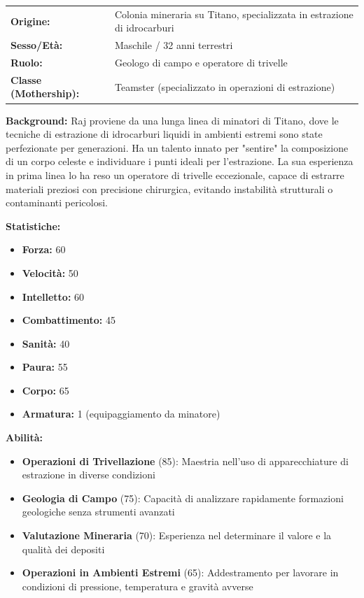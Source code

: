 \documentclass[11pt,a4paper]{article}
\begin{document}
\begin{tcolorbox}[colback=mininglightorange!20, colframe=miningorange]
\begin{tabularx}{\textwidth}{lX}
\textbf{Origine:} & Colonia mineraria su Titano, specializzata in estrazione di idrocarburi \\
\textbf{Sesso/Età:} & Maschile / 32 anni terrestri \\
\textbf{Ruolo:} & Geologo di campo e operatore di trivelle \\
\textbf{Classe (Mothership):} & Teamster (specializzato in operazioni di estrazione) \\
\end{tabularx}

\textbf{Background:} Raj proviene da una lunga linea di minatori di Titano, dove le tecniche di estrazione di idrocarburi liquidi in ambienti estremi sono state perfezionate per generazioni. Ha un talento innato per "sentire" la composizione di un corpo celeste e individuare i punti ideali per l'estrazione. La sua esperienza in prima linea lo ha reso un operatore di trivelle eccezionale, capace di estrarre materiali preziosi con precisione chirurgica, evitando instabilità strutturali o contaminanti pericolosi.

\textbf{Statistiche:}
\begin{itemize}[leftmargin=*]
\item \textbf{Forza:} 60
\item \textbf{Velocità:} 50
\item \textbf{Intelletto:} 60
\item \textbf{Combattimento:} 45
\item \textbf{Sanità:} 40
\item \textbf{Paura:} 55
\item \textbf{Corpo:} 65
\item \textbf{Armatura:} 1 (equipaggiamento da minatore)
\end{itemize}

\textbf{Abilità:}
\begin{itemize}[leftmargin=*]
\item \textbf{Operazioni di Trivellazione} (85): Maestria nell'uso di apparecchiature di estrazione in diverse condizioni
\item \textbf{Geologia di Campo} (75): Capacità di analizzare rapidamente formazioni geologiche senza strumenti avanzati
\item \textbf{Valutazione Mineraria} (70): Esperienza nel determinare il valore e la qualità dei depositi
\item \textbf{Operazioni in Ambienti Estremi} (65): Addestramento per lavorare in condizioni di pressione, temperatura e gravità avverse
\end{itemize}


\end{tcolorbox}
\end{document}
